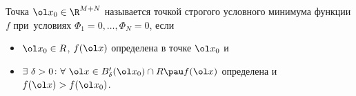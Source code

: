 
Точка \(\ol x_0\in\R^{M+N}\) называется точкой строгого условного минимума функции \(f\) при~условиях \(\Phi_1=0,\dots,\Phi_N=0\), если
\begin{itemize}
\item \(\ol x_0\in R\), \(f(\ol x)\) определена в точке \(\ol x_0\) и
\item \(\exists\ \delta>0\colon \forall\ \ol x\in B'_\delta(\ol x_0)\cap R\pau f(\ol x)\) определена и \(f(\ol x) > f(\ol x_0)\).
\end{itemize}
